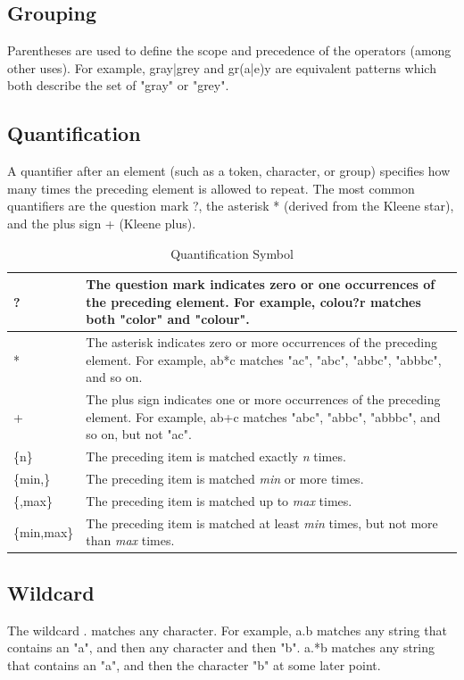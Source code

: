 \documentclass{article}
\begin{document}
\subsection{Grouping}
Parentheses are used to define the scope and precedence of the operators (among other uses). For example, gray|grey and
gr(a|e)y are equivalent patterns which both describe the set of "gray" or "grey".

\subsection{Quantification}
A quantifier after an element (such as a token, character, or group) specifies how many times the preceding element is
allowed to repeat. The most common quantifiers are the question mark ?, the asterisk * (derived from the Kleene star),
and the plus sign + (Kleene plus).
\begin{longtable}{|m{}|m{}|}
\caption{Quantification Symbol} \\
\hline
    ? & The question mark indicates zero or one occurrences of the preceding element. For example, colou?r matches both
    "color" and "colour". \\
\hline
    * & The asterisk indicates zero or more occurrences of the preceding element. For example, ab*c matches "ac", "abc",
    "abbc", "abbbc", and so on. \\
\hline
    + & The plus sign indicates one or more occurrences of the preceding element. For example, ab+c matches "abc",
    "abbc", "abbbc", and so on, but not "ac". \\
\hline
    \{n\} & The preceding item is matched exactly \textit{n} times. \\
\hline
    \{min,\} & The preceding item is matched \textit{min} or more times. \\
\hline
    \{,max\} & The preceding item is matched up to \textit{max} times. \\
    \hline
    \{min,max\} & The preceding item is matched at least \textit{min} times, but not more than \textit{max} times. \\
\hline
\end{longtable}

\subsection{Wildcard}
The wildcard . matches any character. For example, a.b matches any string that contains an "a", and then any character
and then "b". a.*b matches any string that contains an "a", and then the character "b" at some later point.
\end{document}
